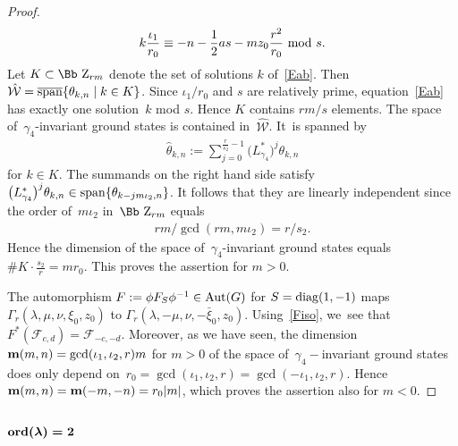 \documentclass[10pt,a4paper]{amsart}
\newcommand\ZZ{{\mbox{\Bb Z}}}
\newcommand\bm{\textbf{{\rm \textbf{m}}}}
\newcommand\cW{{\mathcal W}}
\newcommand\cF{{\mathcal F}}
\newcommand{\Aut}{\mathop{{\rm Aut}}}
\newcommand{\diag}{\mathop{{\rm diag}}}
\newcommand{\Span}{\mathop{{\rm span}}}
\newcommand{\cSpan}{{\overline{\rm span}}}
\newcommand{\ord}{{\rm ord}}
\numberwithin{equation}{section}
\begin{document}
\begin{proof}
\begin{gather}\label{Eab}
 k\frac {\iota_1}{r_0}\equiv -n-\frac12 as-mz_0\frac{r^2}{r_0} \ {\rm mod}\ s.
\end{gather}
Let $K\subset\ZZ_{rm}$ denote the set of solutions $k$ of~\eqref{Eab}. Then $\hat\cW=\cSpan\{\theta_{k,n}\mid k\in K\}$. Since $\iota_1/r_0$ and $s$ are relatively prime, equation~\eqref{Eab} has exactly one solution~$k$ mod $s$. Hence $K$ contains $rm/s$ elements. The space of~$\gamma_4$-invariant ground states is contained in~$\hat\cW$. It~is spanned by
\begin{gather*}
\hat \theta_{k,n}:=\sum_{j=0}^{\frac r{s_2}-1}\big(L_{\gamma_4}^*\big)^{j}\theta_{k,n}
\end{gather*}
for $k\in K$. The summands on the right hand side satisfy $\big(L_{\gamma_4}^*\big)^{j}\theta_{k,n}\in\Span\{\theta_{k-jm\iota_2,n}\}$. It follows that they are linearly independent since the order of~$m\iota_2$ in~$\ZZ_{rm}$ equals
\begin{gather*}
rm/\gcd(rm,m\iota_2)=r/s_2.
\end{gather*}
Hence the dimension of the space of~$\gamma_4$-invariant ground states equals $\# K \cdot \frac {s_2}r=m r_0$. This proves the assertion for $m>0$.

The automorphism $F:=\phi F_{S}\phi^{-1}\in \Aut(G)$ for $S=\diag(1,-1)$ maps $\Gamma_r(\lambda,\mu,\nu,\xi_0,z_0)$ to $\Gamma_r(\lambda,-\mu,\nu,-\bar\xi_0,z_0)$. Using~\eqref{Fiso}, we~see that $F^*(\cF_{c,d})=\cF_{-c,-d}$. Moreover, as we have seen, the dimension~$\bm(m,n)=\gcd(\iota_1,\iota_2,r) m$ for $m>0$ of the space of~$\gamma_4-$invariant ground states does only depend on~$r_0=\gcd(\iota_1,\iota_2,r)=\gcd(-\iota_1,\iota_2,r)$. Hence $\bm(m,n)=\bm(-m,-n)=r_0|m|$, which proves the assertion also for $m<0$.
\end{proof}

\subsubsection[$\ord(\lambda)=2$]{$\boldsymbol{\ord(\lambda)=2}$}
\end{document}
